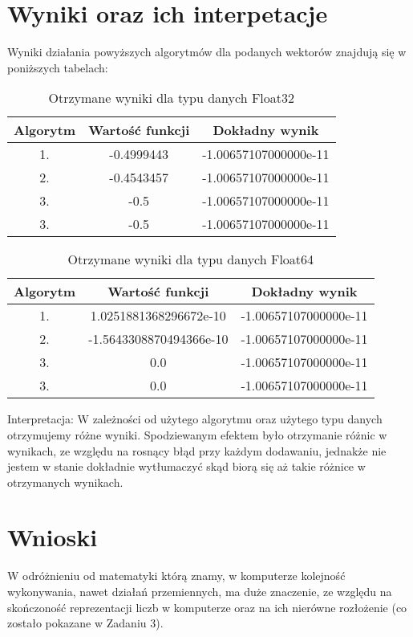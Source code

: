 \documentclass[a4paper,14pt]{report}
\begin{document}
\section{Wyniki oraz ich interpetacje}
Wyniki działania powyższych algorytmów dla podanych wektorów znajdują się w poniższych tabelach:
\begin{table}[h!]
\centering
\begin{tabular}{|c | c | c |} 
 \hline
 Algorytm & Wartość funkcji & Dokładny wynik \\ [0.5ex] 
 \hline\hline
 1. & -0.4999443 & -1.00657107000000e-11  \\ 
 2. & -0.4543457 & -1.00657107000000e-11 \\
 3. & -0.5 & -1.00657107000000e-11 \\
 3. & -0.5 & -1.00657107000000e-11 \\
 \hline
\end{tabular}
\caption{Otrzymane wyniki dla typu danych Float32}
\label{Zad5Float32}
\end{table}


\begin{table}[h!]
\centering
\begin{tabular}{|c | c | c |} 
 \hline
 Algorytm & Wartość funkcji & Dokładny wynik \\ [0.5ex] 
 \hline\hline
 1.& 1.0251881368296672e-10 & -1.00657107000000e-11 \\ 
 2. & -1.5643308870494366e-10 & -1.00657107000000e-11 \\
 3. & 0.0 & -1.00657107000000e-11 \\
 3. & 0.0 & -1.00657107000000e-11 \\
 \hline
\end{tabular}
\caption{Otrzymane wyniki dla typu danych Float64}
\label{Zad5Float64}
\end{table}

Interpretacja: W zależności od użytego algorytmu oraz użytego typu danych otrzymujemy różne wyniki. Spodziewanym efektem było otrzymanie różnic w wynikach, ze względu na rosnący błąd przy każdym dodawaniu, jednakże nie jestem w stanie dokładnie wytłumaczyć skąd biorą się aż takie różnice w otrzymanych wynikach.
\section{Wnioski}
W odróżnieniu od matematyki którą znamy, w komputerze kolejność wykonywania, nawet działań przemiennych, ma duże znaczenie, ze względu na skończoność reprezentacji liczb w komputerze oraz na ich nierówne rozłożenie (co zostało pokazane w Zadaniu 3).
\end{document}
